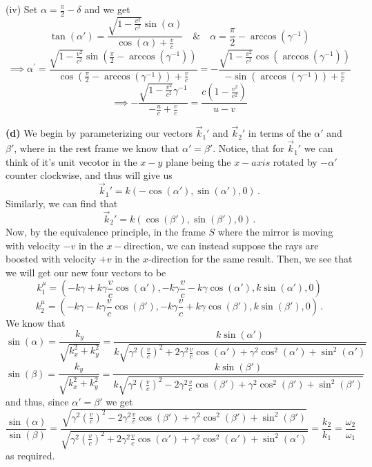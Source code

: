 \documentclass[10pt]{article}
\begin{document}
(iv) Set $\alpha = \frac{\pi}{2} - \delta$ and we get
\[ \tan(\alpha') = \frac{\sqrt{1- \frac{v^{2}}{c^{2}}}\sin(\alpha)}{\cos(\alpha) + \frac{v}{c}} \quad \& \quad\alpha = \frac{\pi}{2} - \arccos(\gamma^{-1})\]
\[ \implies \alpha^{\prime} =\frac{\sqrt{1- \frac{v^{2}}{c^{2}}}\sin(\frac{\pi}{2} -\arccos(\gamma^{-1}))}{\cos(\frac{\pi}{2} - \arccos(\gamma^{-1})) + \frac{v}{c}} = -\frac{\sqrt{1- \frac{v^{2}}{c^{2}}}\cos(\arccos(\gamma^{-1}))}{-\sin(\arccos(\gamma^{-1})) + \frac{v}{c}} \]
\[ \implies -\frac{\sqrt{1- \frac{v^{2}}{c^{2}}}\gamma^{-1}}{-\frac{u}{c} + \frac{v}{c}} = \frac{c\left(1 - \frac{v^{2}}{c^{2}}\right)}{u - v}\]

\textbf{(d)} We begin by parameterizing our vectors $\vec{k}_{1}'$ and $\vec{k}_{2}'$ in terms of the $\alpha'$ and $\beta'$, where in the rest frame we know that $\alpha' = \beta'$. Notice, that for $\vec{k}_{1}'$ we can think of it's unit vecotor in the $x-y$ plane being the $x-axis$ rotated by $-\alpha'$ counter clockwise, and thus will give us
\[ \vec{k}_{1}' = k(-\cos(\alpha'), \sin(\alpha'),0) \, .\]
Similarly, we can find that
\[ \vec{k}_{2}' = k(\cos(\beta'), \sin(\beta'),0) \, .\]
Now, by the equivalence principle, in the frame $S$ where the mirror is moving with velocity $-v$ in the $x-$direction, we can instead suppose the rays are boosted with velocity $+v$ in the $x$-direction for the same result. Then, we see that we will get our new four vectors to be
\[ k_{1}^{\mu} = \left(-k\gamma +k\gamma\frac{v}{c}\cos(\alpha'), -k\gamma\frac{v}{c} - k\gamma\cos(\alpha'), k\sin(\alpha'), 0\right) \]
\[ k_{2}^{\mu} = \left(-k\gamma -k\gamma\frac{v}{c}\cos(\beta'), -k\gamma\frac{v}{c} + k\gamma\cos(\beta'), k\sin(\beta'), 0\right) \, .\]
We know that
\[ \sin(\alpha) = \frac{k_{y}}{\sqrt{k_{x}^{2} + k_{y}^{2}}} = \frac{k\sin(\alpha')}{k\sqrt{\gamma^{2}\left(\frac{v}{c}\right)^{2} + 2\gamma^{2}\frac{v}{c}\cos(\alpha') + \gamma^{2}\cos^{2}(\alpha') + \sin^{2}(\alpha')}} \]
\[ \sin(\beta) = \frac{k_{y}}{\sqrt{k_{x}^{2} + k_{y}^{2}}} = \frac{k\sin(\beta')}{k\sqrt{\gamma^{2}\left(\frac{v}{c}\right)^{2} - 2\gamma^{2}\frac{v}{c}\cos(\beta') + \gamma^{2}\cos^{2}(\beta') + \sin^{2}(\beta')}} \]
and thus, since $\alpha' = \beta'$ we get
\[ \frac{\sin(\alpha)}{\sin(\beta)} = \frac{\sqrt{\gamma^{2}\left(\frac{v}{c}\right)^{2} - 2\gamma^{2}\frac{v}{c}\cos(\beta') + \gamma^{2}\cos^{2}(\beta') + \sin^{2}(\beta')}}{\sqrt{\gamma^{2}\left(\frac{v}{c}\right)^{2} + 2\gamma^{2}\frac{v}{c}\cos(\alpha') + \gamma^{2}\cos^{2}(\alpha') + \sin^{2}(\alpha')}} = \frac{k_{2}}{k_{1}} = \frac{\omega_{2}}{\omega_{1}} \]
as required.
\end{document}
